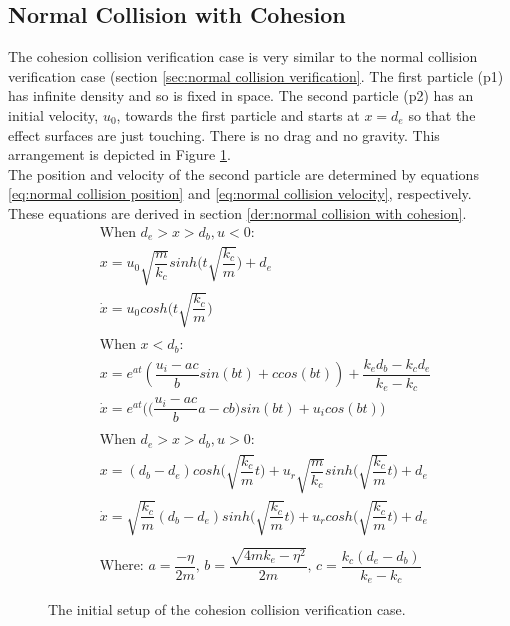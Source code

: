 \documentclass[10pt,a4paper,titlepage]{report}
\begin{document}
\subsection{Normal Collision with Cohesion}
The cohesion collision verification case is very similar to the normal collision verification case (section \ref{sec:normal collision verification}. The first particle (p1) has infinite density and so is fixed in space. The second particle (p2) has an initial velocity, $u_0$, towards the first particle and starts at $x = d_e$ so that the effect surfaces are just touching. There is no drag and no gravity. This arrangement is depicted in Figure \ref{fig:cohesion collision}.
\\The position and velocity of the second particle are determined by equations \ref{eq:normal collision position} and \ref{eq:normal collision velocity}, respectively. These equations are derived in section \ref{der:normal collision with cohesion}.
\begin{align}
&\text{When $d_e > x > d_b, u < 0$:} \nonumber \\
&x = u_0 \sqrt{\dfrac{m}{k_c}} sinh\Big(t\sqrt{\dfrac{k_c}{m}}\Big) + d_e \\
&\dot{x} = u_0 cos h\Big(t\sqrt{\dfrac{k_c}{m}}\Big) \\ \nonumber \\
&\text{When $x < d_b$:} \nonumber \\
&x = e^{at} (\dfrac{u_i - ac}{b} sin(bt) + c cos (bt)) + \dfrac{k_e d_b - k_c d_e}{k_e - k_c} \\
&\dot{x} = e^{at}\Big(\Big(\dfrac{u_i - ac}{b} a - c b\Big)sin(bt) + u_i cos(bt)\Big) \\ \nonumber \\
&\text{When $d_e > x > d_b, u > 0$:} \nonumber \\
&x = (d_b - d_e)cosh\Big(\sqrt{\dfrac{k_c}{m}} t\Big) + u_r \sqrt{\dfrac{m}{k_c}} sinh\Big(\sqrt{\dfrac{k_c}{m}}t\Big) + d_e \\
&\dot{x} = \sqrt{\dfrac{k_c}{m}}(d_b - d_e)sinh\Big(\sqrt{\dfrac{k_c}{m}} t\Big) + u_r cosh\Big(\sqrt{\dfrac{k_c}{m}}t\Big) + d_e \\ \nonumber \\
&\text{Where: } a = \dfrac{-\eta}{2m} \text{,    } b = \dfrac{\sqrt{4mk_e - \eta ^ 2}}{2m} \text{,    } c = \dfrac{k_c (d_e - d_b)}{k_e - k_c} \nonumber
\end{align}
\begin{figure}[!ht]
\centering

\caption{The initial setup of the cohesion collision verification case.}
\label{fig:cohesion collision}
\end{figure}
\end{document}
